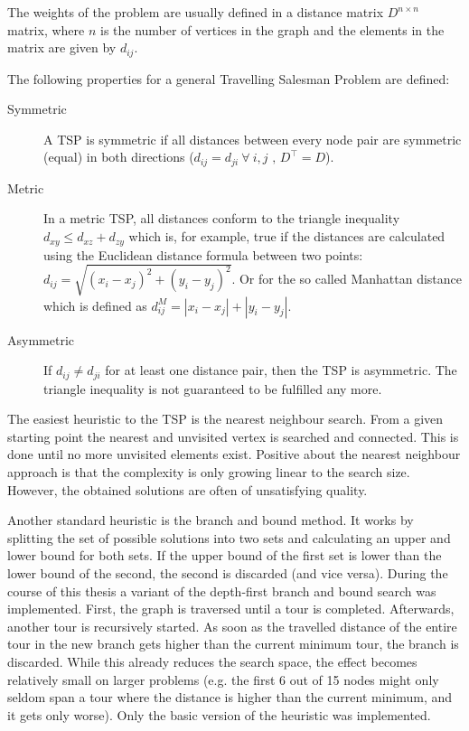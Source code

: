 The weights of the problem are usually defined in a distance matrix  $D^{n \times n}$ matrix, where $n$ is the number of vertices in the graph and the elements in the matrix are given by $d_{ij}$.

The following properties for a general Travelling Salesman Problem are defined:

\begin{description}
\item[Symmetric] A TSP is symmetric if all distances between every node pair are symmetric (equal) in both directions ($d_{ij} = d_{ji} ~ \forall ~ i, j \mbox{ , } D^\intercal = D$).
\item[Metric] In a metric TSP, all distances conform to the triangle inequality $d_{xy} \leq d_{xz} + d_{zy} $ which is, for example, true if the distances are calculated using the Euclidean distance formula between two points: $d_{ij} = \sqrt{(x_i -x_j)^2 + (y_i - y_j)^2}$. Or for the so called Manhattan distance which is defined as ${d_{ij}^M} = |x_i-x_j| + |y_i - y_j|$.
\item[Asymmetric] If $d_{ij} \neq d_{ji}$ for at least one distance pair, then the TSP is asymmetric. The triangle inequality is not guaranteed to be fulfilled any more.
\end{description}

The easiest heuristic to the TSP is the nearest neighbour search. From a given starting point the nearest and unvisited vertex is searched and connected. This is done until no more unvisited elements exist. Positive about the nearest neighbour approach is that the complexity is only growing linear to the search size. However, the obtained solutions are often of unsatisfying quality.

Another standard heuristic is the branch and bound method. It works by splitting the set of possible solutions into two sets and calculating an upper and lower bound for both sets. If the upper bound of the first set is lower than the lower bound of the second, the second is discarded (and vice versa). During the course of this thesis a variant of the depth-first branch and bound search was implemented. First, the graph is traversed until a tour is completed. Afterwards, another tour is recursively started. As soon as the travelled distance of the entire tour in the new branch gets higher than the current minimum tour, the branch is discarded. 
While this already reduces the search space, the effect becomes relatively small on larger problems (e.g. the first 6 out of 15 nodes might only seldom span a tour where the distance is higher than the current minimum, and it gets only worse). Only the basic version of the heuristic was implemented.

